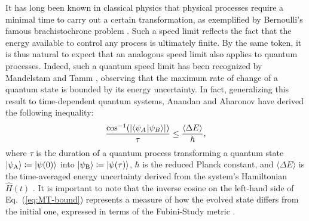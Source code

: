 \documentclass[aps,pra,reprint,a4paper,nofootinbib,superscriptaddress,numbers,longbibliography,showpacs,showkeys,floatfix]{revtex4-1}
\newcommand{\coloneqq}{\mathrel {\mathop : } \mathrel {\mkern -1.2mu}=}
\def\ket#1{\left|#1\right\rangle}
\def\braket#1#2{\left\langle#1\kern-2pt\right.\left|#2\right\rangle}
\renewcommand\textemdash{\leavevmode\unskip\kern0.8pt\rule[0.19\baselineskip]{8pt}{0.4pt}\kern1pt\ignorespaces}
\begin{document}
It has long been known in classical physics that physical processes require a minimal time to carry out a certain transformation, as exemplified by Bernoulli's famous brachistochrone problem \cite{Haws:1995}.
%
Such a speed limit reflects the fact that the energy available to control any process is ultimately finite.
%
%
By the same token, it is thus natural to expect that an analogous speed limit also applies to quantum processes.
%
Indeed, such a quantum speed limit has been recognized by Mandelstam and Tamm \cite{Mandelstam:1945}, observing that the maximum rate of change of a quantum state is bounded by its energy uncertainty.
%
In fact, generalizing this result to time-dependent quantum systems, Anandan and Aharonov \cite{Anandan:1990} have derived the following inequality:
%
\begin{equation}
	\label{eq:MT-bound}
	\frac{\cos^{-1}(\left|\braket{\psi_A}{\psi_B}\right|)}{\tau} \leq \frac{\langle\Delta E\rangle}{\hbar},
\end{equation}
where $\tau$ is the duration of a quantum process transforming a quantum state $\ket{\psi_\text{A}} \coloneqq \ket{\psi(0)}$ into $\ket{\psi_\text{B}} \coloneqq \ket{\psi(\tau)}$,
$\hbar$ is the reduced Planck constant, and $\langle \Delta E \rangle$ is the time-averaged energy uncertainty derived from the system's Hamiltonian $\hat{H}(t)$ \cite{defDeltaH}.
%
%
It is important to note that the inverse cosine on the left-hand side of Eq.~(\ref{eq:MT-bound}) represents a measure of how the evolved state differs from the initial one, expressed in terms of the Fubini-Study metric \cite{Bengtsson:2017}.
%
%
\end{document}
